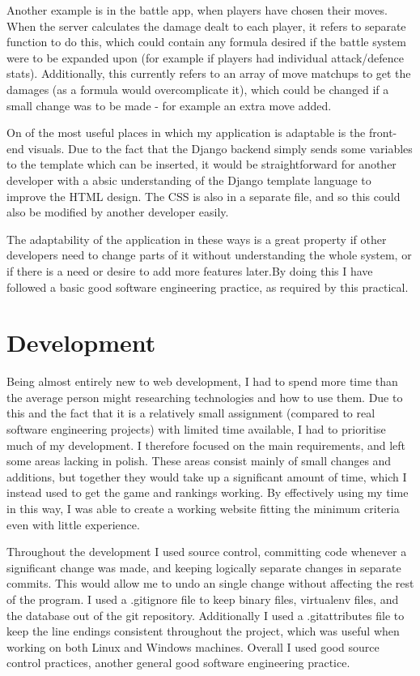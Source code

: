 \documentclass{article}
\begin{document}
Another example is in the battle app, when players have chosen their moves. When the server calculates the damage dealt to each player, it refers to separate function to do this, which could contain any formula desired if the battle system were to be expanded upon (for example if players had individual attack/defence stats). Additionally, this currently refers to an array of move matchups to get the damages (as a formula would overcomplicate it), which could be changed if a small change was to be made - for example an extra move added.

On of the most useful places in which my application is adaptable is the front-end visuals. Due to the fact that the Django backend simply sends some variables to the template which can be inserted, it would be straightforward for another developer with a absic understanding of the Django template language to improve the HTML design. The CSS is also in a separate file, and so this could also be modified by another developer easily.

The adaptability of the application in these ways is a great property if other developers need to change parts of it without understanding the whole system, or if there is a need or desire to add more features later.By doing this I have followed a basic good software engineering practice, as required by this practical.

\section{Development}

Being almost entirely new to web development, I had to spend more time than the average person might researching technologies and how to use them. Due to this and the fact that it is a relatively small assignment (compared to real software engineering projects) with limited time available, I had to prioritise much of my development. I therefore focused on the main requirements, and left some areas lacking in polish. These areas consist mainly of small changes and additions, but together they would take up a significant amount of time, which I instead used to get the game and rankings working. By effectively using my time in this way, I was able to create a working website fitting the minimum criteria even with little experience.

Throughout the development I used source control, committing code whenever a significant change was made, and keeping logically separate changes in separate commits. This would allow me to undo an single change without affecting the rest of the program. I used a .gitignore file to keep binary files, virtualenv files, and the database out of the git repository. Additionally I used a .gitattributes file to keep the line endings consistent throughout the project, which was useful when working on both Linux and Windows machines. Overall I used good source control practices, another general good software engineering practice.
\end{document}
